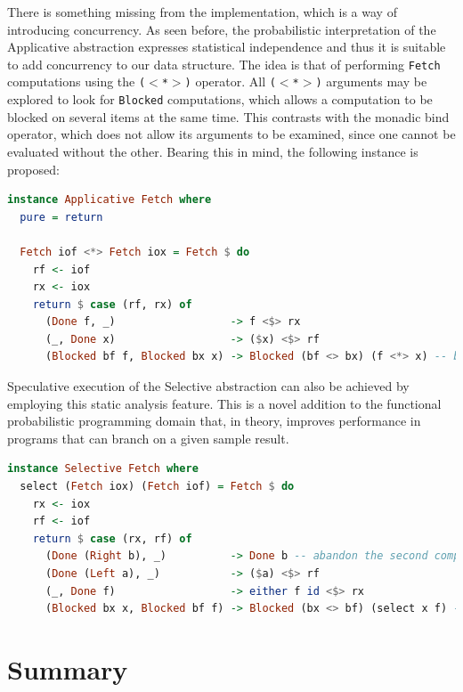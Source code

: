 \documentclass[
  oneside,
  11pt, a4paper,
  footinclude=true,
  headinclude=true,
  cleardoublepage=empty
]{scrbook}
\theoremstyle{definition}
\theoremstyle{definition}
\begin{document}
There is something missing from the implementation, which is a way of introducing concurrency. As seen before, the probabilistic interpretation of the Applicative abstraction expresses statistical independence and thus it is suitable to add concurrency to our data structure. The idea is that of performing \texttt{Fetch} computations using the \texttt{($<$*$>$)} operator. All \texttt{($<$*$>$)} arguments may be explored to look for \texttt{Blocked} computations, which allows a computation to be blocked on several items at the same time. This contrasts with the monadic bind operator, which does not allow its arguments to be examined, since one cannot be evaluated without the other. Bearing this in mind, the following instance is proposed:

    \begin{lstlisting}[language=Haskell, caption={Fetch Applicative instance},captionpos=b]
instance Applicative Fetch where
  pure = return

  Fetch iof <*> Fetch iox = Fetch $ do
    rf <- iof
    rx <- iox
    return $ case (rf, rx) of
      (Done f, _)                  -> f <$> rx
      (_, Done x)                  -> ($x) <$> rf
      (Blocked bf f, Blocked bx x) -> Blocked (bf <> bx) (f <*> x) -- batching parallel requests
    \end{lstlisting}
    
Speculative execution of the Selective abstraction can also be achieved by employing this static analysis feature. This is a novel addition to the functional probabilistic programming domain that, in theory, improves performance in programs that can branch on a given sample result.

    \begin{lstlisting}[language=Haskell, caption={Fetch Selective instance},captionpos=b]
instance Selective Fetch where
  select (Fetch iox) (Fetch iof) = Fetch $ do
    rx <- iox
    rf <- iof
    return $ case (rx, rf) of
      (Done (Right b), _)          -> Done b -- abandon the second computation
      (Done (Left a), _)           -> ($a) <$> rf
      (_, Done f)                  -> either f id <$> rx
      (Blocked bx x, Blocked bf f) -> Blocked (bx <> bf) (select x f) -- speculative execution
    \end{lstlisting}
    
    \section{Summary}
    
\end{document}
